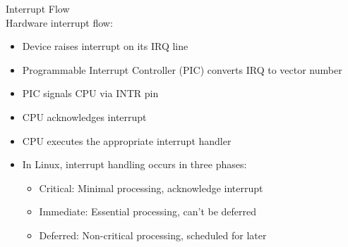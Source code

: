 \begin{definition}{Interrupt Flow}\\
    Hardware interrupt flow:
    \begin{itemize}
        \item Device raises interrupt on its IRQ line
        \item Programmable Interrupt Controller (PIC) converts IRQ to vector number
        \item PIC signals CPU via INTR pin
        \item CPU acknowledges interrupt
        \item CPU executes the appropriate interrupt handler
        \item In Linux, interrupt handling occurs in three phases:
            \begin{itemize}
                \item Critical: Minimal processing, acknowledge interrupt
                \item Immediate: Essential processing, can't be deferred
                \item Deferred: Non-critical processing, scheduled for later
            \end{itemize}
    \end{itemize}
\end{definition}

